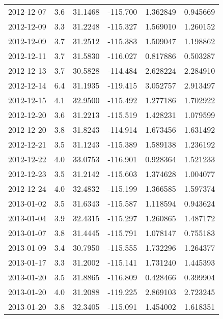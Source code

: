 \begin{tabular}{lrrrrr}
2012-12-07 &       3.6 &  31.1468 &  -115.700 &         1.362849 &         0.945669 \\
2012-12-09 &       3.3 &  31.2248 &  -115.327 &         1.569010 &         1.260152 \\
2012-12-09 &       3.7 &  31.2512 &  -115.383 &         1.509047 &         1.198862 \\
2012-12-11 &       3.7 &  31.5830 &  -116.027 &         0.817886 &         0.503287 \\
2012-12-13 &       3.7 &  30.5828 &  -114.484 &         2.628224 &         2.284910 \\
2012-12-14 &       6.4 &  31.1935 &  -119.415 &         3.052757 &         2.913497 \\
2012-12-15 &       4.1 &  32.9500 &  -115.492 &         1.277186 &         1.702922 \\
2012-12-20 &       3.6 &  31.2213 &  -115.519 &         1.428231 &         1.079599 \\
2012-12-20 &       3.8 &  31.8243 &  -114.914 &         1.673456 &         1.631492 \\
2012-12-21 &       3.5 &  31.1243 &  -115.389 &         1.589138 &         1.236192 \\
2012-12-22 &       4.0 &  33.0753 &  -116.901 &         0.928364 &         1.521233 \\
2012-12-23 &       3.5 &  31.2142 &  -115.603 &         1.374628 &         1.004077 \\
2012-12-24 &       4.0 &  32.4832 &  -115.199 &         1.366585 &         1.597374 \\
2013-01-02 &       3.5 &  31.6343 &  -115.587 &         1.118594 &         0.943624 \\
2013-01-04 &       3.9 &  32.4315 &  -115.297 &         1.260865 &         1.487172 \\
2013-01-07 &       3.8 &  31.4445 &  -115.791 &         1.078147 &         0.755183 \\
2013-01-09 &       3.4 &  30.7950 &  -115.555 &         1.732296 &         1.264377 \\
2013-01-17 &       3.3 &  31.2002 &  -115.141 &         1.731240 &         1.445393 \\
2013-01-20 &       3.5 &  31.8865 &  -116.809 &         0.428466 &         0.399904 \\
2013-01-20 &       4.0 &  31.2088 &  -119.225 &         2.869103 &         2.723245 \\
2013-01-20 &       3.8 &  32.3405 &  -115.091 &         1.454002 &         1.618351 \\

\end{tabular}
